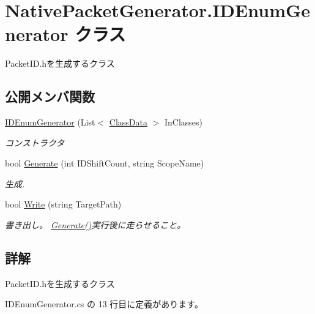 \hypertarget{classNativePacketGenerator_1_1IDEnumGenerator}{}\section{Native\+Packet\+Generator.\+I\+D\+Enum\+Generator クラス}
\label{classNativePacketGenerator_1_1IDEnumGenerator}


Packet\+I\+D.\+hを生成するクラス  


\subsection*{公開メンバ関数}
\begin{DoxyCompactItemize}
\item 
\mbox{\hyperlink{classNativePacketGenerator_1_1IDEnumGenerator_a445d41e87a9a5f6345de9107f10331e2}{I\+D\+Enum\+Generator}} (List$<$ \mbox{\hyperlink{classNativePacketGenerator_1_1ClassData}{Class\+Data}} $>$ In\+Classes)
\begin{DoxyCompactList}\small\item\em コンストラクタ \end{DoxyCompactList}\item 
bool \mbox{\hyperlink{classNativePacketGenerator_1_1IDEnumGenerator_a44b0dd37c3fc1a6661a4e949c2294cb9}{Generate}} (int I\+D\+Shift\+Count, string Scope\+Name)
\begin{DoxyCompactList}\small\item\em 生成. \end{DoxyCompactList}\item 
bool \mbox{\hyperlink{classNativePacketGenerator_1_1IDEnumGenerator_ada5570f3f87cb3fcbb28ae02985b2dc9}{Write}} (string Target\+Path)
\begin{DoxyCompactList}\small\item\em 書き出し。 \mbox{\hyperlink{classNativePacketGenerator_1_1IDEnumGenerator_a44b0dd37c3fc1a6661a4e949c2294cb9}{Generate()}}実行後に走らせること。 \end{DoxyCompactList}\end{DoxyCompactItemize}


\subsection{詳解}
Packet\+I\+D.\+hを生成するクラス 



 I\+D\+Enum\+Generator.\+cs の 13 行目に定義があります。



